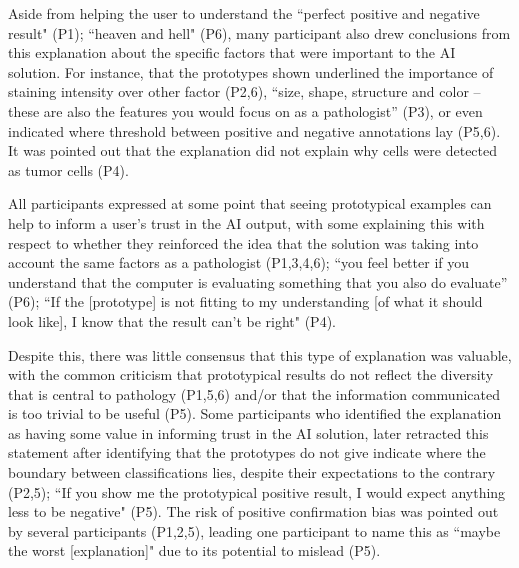 Aside from helping the user to understand the ``perfect positive and negative result" (P1); ``heaven and hell" (P6), many participant also drew conclusions from this explanation about the specific factors that were important to the AI solution. For instance, that the prototypes shown underlined the importance of staining intensity over other factor (P2,6), ``size, shape, structure and color -- these are also the features you would focus on as a pathologist” (P3), or even indicated where threshold between positive and negative annotations lay (P5,6). It was pointed out that the explanation did not explain why cells were detected as tumor cells (P4).


All participants expressed at some point that seeing prototypical examples can help to inform a user's trust in the AI output, with some explaining this with respect to whether they reinforced the idea that the solution was taking into account the same factors as a pathologist (P1,3,4,6); “you feel better if you understand that the computer is evaluating something that you also do evaluate” (P6); ``If the [prototype] is not fitting to my understanding [of what it should look like], I know that the result can't be right" (P4). 


Despite this, there was little consensus that this type of explanation was valuable, with the common criticism that prototypical results do not reflect the diversity that is central to pathology (P1,5,6) and/or that the information communicated is too trivial to be useful (P5). Some participants who identified the explanation as having some value in informing trust in the AI solution, later retracted this statement after identifying that the prototypes do not give indicate where the boundary between classifications lies, despite their expectations to the contrary (P2,5); ``If you show me the prototypical positive result, I would expect anything less to be negative" (P5). The risk of positive confirmation bias was pointed out by several participants (P1,2,5), leading one participant to name this as ``maybe the worst [explanation]" due to its potential to mislead (P5).

